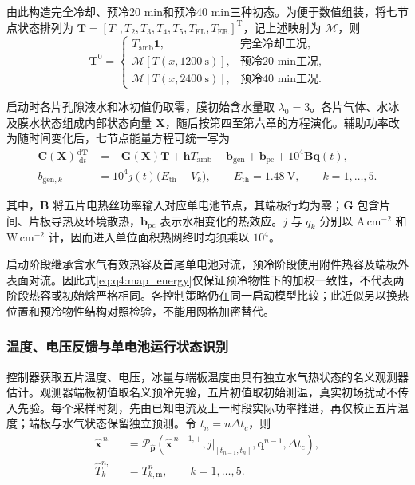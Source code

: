 \documentclass[bwprint]{gmcmthesis}
\numberwithin{equation}{section}
\numberwithin{figure}{section}
\begin{document}
由此构造完全冷却、预冷20 min和预冷40 min三种初态。为便于数值组装，将七节点状态排列为 $\boldsymbol T=[T_1,T_2,T_3,T_4,T_5,T_{\mathrm{EL}},T_{\mathrm{ER}}]^{\mathrm T}$，记上述映射为 $\mathcal M$，则
\begin{equation}
\boldsymbol T^0=\begin{cases}
T_{\mathrm{amb}}\boldsymbol 1, & \text{完全冷却工况},\\
\mathcal M[T(x,1200\ \mathrm s)], & \text{预冷20 min工况},\\
\mathcal M[T(x,2400\ \mathrm s)], & \text{预冷40 min工况}.
\end{cases}
\label{eq:q4:three_initial_states}
\end{equation}

启动时各片孔隙液水和冰初值仍取零，膜初始含水量取 $\lambda_0=3$。各片气体、水冰及膜水状态组成内部状态向量 $\boldsymbol X$，随后按第四至第六章的方程演化。辅助功率改为随时间变化后，七节点能量方程可统一写为
\begin{equation}
\begin{aligned}
\boldsymbol C(\boldsymbol X)\frac{\mathrm d\boldsymbol T}{\mathrm dt}
&=-\boldsymbol G(\boldsymbol X)\boldsymbol T
+\boldsymbol hT_{\mathrm{amb}}+\boldsymbol b_{\mathrm{gen}}
+\boldsymbol b_{\mathrm{pc}}+10^4\boldsymbol B\boldsymbol q(t),\\
b_{\mathrm{gen},k}&=10^4j(t)\big(E_{\mathrm{th}}-V_k\big),\qquad
E_{\mathrm{th}}=1.48\ \mathrm V,\qquad k=1,\ldots,5.
\end{aligned}
\label{eq:q4:plant_heat}
\end{equation}

其中，$\boldsymbol B$ 将五片电热丝功率输入对应单电池节点，其端板行均为零；$\boldsymbol G$ 包含片间、片板导热及环境散热，$\boldsymbol b_{\mathrm{pc}}$ 表示水相变化的热效应。$j$ 与 $q_k$ 分别以 $\mathrm{A\,cm^{-2}}$ 和 $\mathrm{W\,cm^{-2}}$ 计，因而进入单位面积热网络时均须乘以 $10^4$。

启动阶段继承含水气有效热容及首尾单电池对流，预冷阶段使用附件热容及端板外表面对流。因此式\eqref{eq:q4:map_energy}仅保证预冷物性下的加权一致性，不代表两阶段热容或初始焓严格相同。各控制策略仍在同一启动模型比较；此近似另以换热位置和预冷物性结构对照检验，不能用网格加密替代。

\subsubsection{温度、电压反馈与单电池运行状态识别}

控制器获取五片温度、电压，冰量与端板温度由具有独立水气热状态的名义观测器估计。观测器端板初值取名义预冷先验，五片初值取初始测温，真实初场扰动不传入先验。每个采样时刻，先由已知电流及上一时段实际功率推进，再仅校正五片温度；端板与水气状态保留独立预测。令 $t_n=n\Delta t_c$，则
\begin{equation}
\begin{aligned}
\widehat{\boldsymbol x}^{\,n,-}
&=\mathcal P_{\widehat{\boldsymbol p}}\!\left(
\widehat{\boldsymbol x}^{\,n-1,+},j|_{[t_{n-1},t_n]},\boldsymbol q^{n-1},\Delta t_c\right),
\\
\widehat T_k^{n,+}&=T_{k,\mathrm m}^n,\qquad k=1,\ldots,5.
\end{aligned}
\label{eq:q4:independent_observer}
\end{equation}
\end{document}
